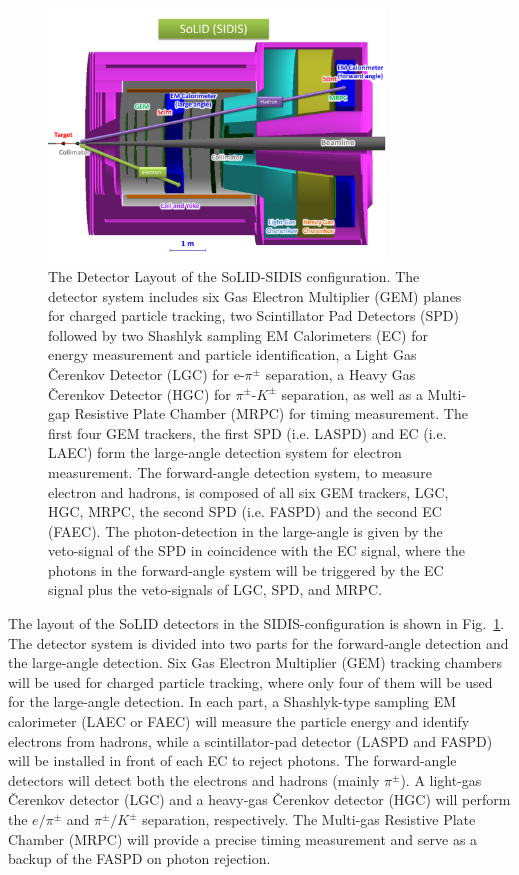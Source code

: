 \begin{figure}[!ht]
 \begin{center}
  \includegraphics[width=0.8\textwidth]{./figures/SoLID_SIDIS_setup.pdf}
   \caption[The Detector Layout of the SoLID-SIDIS configuration]{\footnotesize{The Detector Layout of the SoLID-SIDIS configuration. The detector system includes six Gas Electron Multiplier (GEM) planes for charged particle tracking, two Scintillator Pad Detectors (SPD) followed by two Shashlyk sampling EM Calorimeters (EC) for energy measurement and particle identification, a Light Gas \v{C}erenkov Detector (LGC) for e-$\pi^{\pm}$ separation, a Heavy Gas \v{C}erenkov Detector (HGC) for $\pi^{\pm}$-$K^{\pm}$ separation, as well as a Multi-gap Resistive Plate Chamber (MRPC) for timing measurement. The first four GEM trackers, the first SPD (i.e. LASPD) and EC (i.e. LAEC) form the large-angle detection system for electron measurement. The forward-angle detection system, to measure electron and hadrons, is composed of all six GEM trackers, LGC, HGC, MRPC, the second SPD (i.e. FASPD) and the second EC (FAEC). The photon-detection in the large-angle is given by the veto-signal of the SPD in coincidence with the EC signal, where the photons in the forward-angle system will be triggered by the EC signal plus the veto-signals of LGC, SPD, and MRPC.}}
  \label{solid_sidis}
 \end{center}
\end{figure}
The layout of the SoLID detectors in the SIDIS-configuration is shown in Fig.~\ref{solid_sidis}. The detector system is divided into two parts for the forward-angle detection and the large-angle detection. Six Gas Electron Multiplier (GEM) tracking chambers will be used for charged particle tracking, where only four of them will be used for the large-angle detection. In each part, a Shashlyk-type sampling EM calorimeter (LAEC or FAEC) will measure the particle energy and identify electrons from hadrons, while a scintillator-pad detector (LASPD and FASPD) will be installed in front of each EC to reject photons. The forward-angle detectors will detect both the electrons and hadrons (mainly $\pi^{\pm}$). A light-gas \v{C}erenkov detector (LGC) and a heavy-gas \v{C}erenkov detector (HGC) will perform the $e/\pi^{\pm}$ and $\pi^{\pm}/K^{\pm}$ separation, respectively. The Multi-gas Resistive Plate Chamber (MRPC) will provide a precise timing measurement and serve as a backup of the FASPD on photon rejection. 

